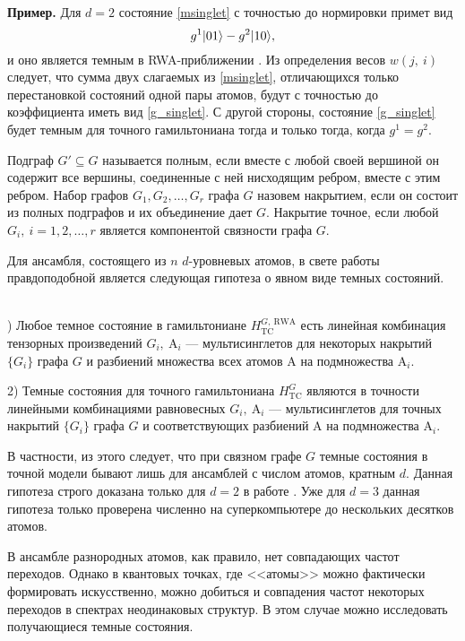 \textbf{Пример.} Для $d=2$ состояние \eqref{msinglet} с точностью до нормировки примет вид 
\begin{equation}
	\label{g_singlet}
	g^{1}|01\rangle-g^{2}|10\rangle,
\end{equation}
и оно является темным в RWA-приближении \cite{rwa_rabi_1,rwa_rabi_2,ozhigov_qq}. Из определения весов $w(j,~i)$ следует, что сумма двух слагаемых из \eqref{msinglet}, отличающихся только перестановкой состояний одной пары атомов, будут с точностью до коэффициента иметь вид \eqref{g_singlet}. С другой стороны, состояние \eqref{g_singlet} будет темным для точного гамильтониана тогда и только тогда, когда $g^{1}=g^{2}$. 

Подграф $G'\subseteq G$ называется полным, если вместе с любой своей вершиной он содержит все вершины, соединенные с ней нисходящим ребром, вместе с этим ребром. Набор графов $G_{1},G_{2},\dots,G_{r}$ графа $G$ назовем накрытием, если он состоит из полных подграфов и их объединение дает $G$. Накрытие точное, если любой $G_{i},~i=1,2,\dots,r$ является компонентой связности графа $G$. 

Для ансамбля, состоящего из $n$ $d$-уровневых атомов, в свете работы \cite{kulagin_homogeneous} правдоподобной является следующая гипотеза о явном виде темных состояний. 

\clearpage
\begin{hyp}
	\
	\\
	) Любое темное состояние в гамильтониане $H^{G,~\text{RWA}}_{\text{TC}}$ есть линейная комбинация тензорных произведений $G_{i},~\text{A}_{i}$ --- мультисинглетов для некоторых накрытий $\{ G_{i}\}$ графа $G$ и разбиений множества всех атомов $\text{A}$ на подмножества $\text{A}_{i}$. 
	
	2) Темные состояния для точного гамильтониана $H^G_{\text{TC}}$ являются в точности линейными комбинациями равновесных $G_{i},~\text{A}_{i}$ --- мультисинглетов для точных накрытий $\{ G_{i}\}$ графа $G$ и соответствующих разбиений $\text{A}$ на подмножества $\text{A}_{i}$. 
\end{hyp}

В частности, из этого следует, что при связном графе $G$ темные состояния в точной модели бывают лишь для ансамблей с числом атомов, кратным $d$. Данная гипотеза строго доказана только для $d=2$ в работе \cite{ozhigov_dimension}. Уже для $d=3$ данная гипотеза только проверена численно на суперкомпьютере до нескольких десятков атомов. 

В ансамбле разнородных атомов, как правило, нет совпадающих частот переходов. Однако в квантовых точках, где <<атомы>> можно фактически формировать искусственно, можно добиться и совпадения частот некоторых переходов в спектрах неодинаковых структур. В этом случае можно исследовать получающиеся темные состояния.

